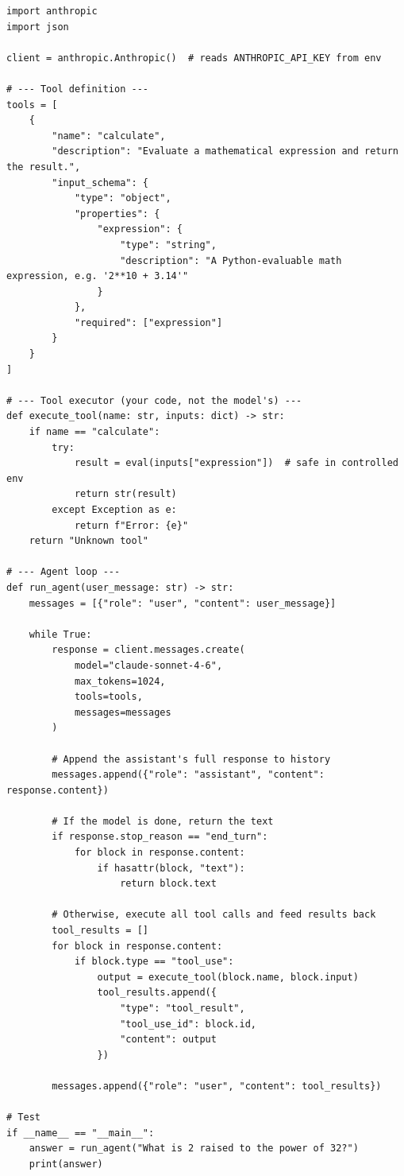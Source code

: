 \documentclass[11pt,letterpaper]{article}
\begin{document}
\begin{lstlisting}[style=PythonStyle, caption={Minimal tool loop with the Anthropic SDK}]
import anthropic
import json

client = anthropic.Anthropic()  # reads ANTHROPIC_API_KEY from env

# --- Tool definition ---
tools = [
    {
        "name": "calculate",
        "description": "Evaluate a mathematical expression and return the result.",
        "input_schema": {
            "type": "object",
            "properties": {
                "expression": {
                    "type": "string",
                    "description": "A Python-evaluable math expression, e.g. '2**10 + 3.14'"
                }
            },
            "required": ["expression"]
        }
    }
]

# --- Tool executor (your code, not the model's) ---
def execute_tool(name: str, inputs: dict) -> str:
    if name == "calculate":
        try:
            result = eval(inputs["expression"])  # safe in controlled env
            return str(result)
        except Exception as e:
            return f"Error: {e}"
    return "Unknown tool"

# --- Agent loop ---
def run_agent(user_message: str) -> str:
    messages = [{"role": "user", "content": user_message}]

    while True:
        response = client.messages.create(
            model="claude-sonnet-4-6",
            max_tokens=1024,
            tools=tools,
            messages=messages
        )

        # Append the assistant's full response to history
        messages.append({"role": "assistant", "content": response.content})

        # If the model is done, return the text
        if response.stop_reason == "end_turn":
            for block in response.content:
                if hasattr(block, "text"):
                    return block.text

        # Otherwise, execute all tool calls and feed results back
        tool_results = []
        for block in response.content:
            if block.type == "tool_use":
                output = execute_tool(block.name, block.input)
                tool_results.append({
                    "type": "tool_result",
                    "tool_use_id": block.id,
                    "content": output
                })

        messages.append({"role": "user", "content": tool_results})

# Test
if __name__ == "__main__":
    answer = run_agent("What is 2 raised to the power of 32?")
    print(answer)
\end{lstlisting}
\end{document}
